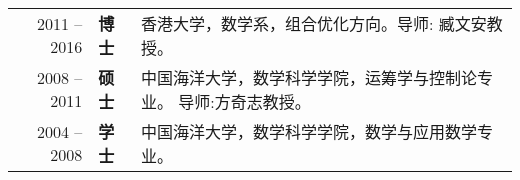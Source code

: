%
%


\begin{tabular}{rll}	
	2011 -- 2016  &  \textbf{博士} &香港大学，数学系，组合优化方向。导师: 臧文安教授。\\
	2008 -- 2011  &  \textbf{硕士} &中国海洋大学，数学科学学院，运筹学与控制论专业。 导师:方奇志教授。\\
	2004 -- 2008  &  \textbf{学士} &中国海洋大学，数学科学学院，数学与应用数学专业。
\end{tabular}